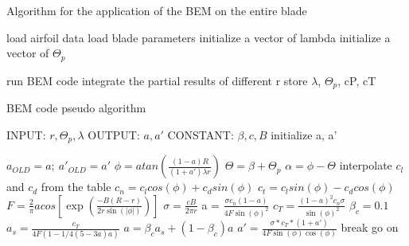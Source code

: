 \begin{algorithm}
\caption{Algorithm for the application of the BEM on the entire blade}\label{alg:MainBEM}
\begin{algorithmic}
\State load airfoil data
\State load blade parameters
\State initialize a vector of lambda
\State initialize a vector of $\Theta_p$

    \State run BEM code
    \EndFor 
    \State integrate the partial results of different r
    \State store $\lambda$, $\Theta_p$, cP, cT
 \EndFor
\EndFor 
\end{algorithmic}
\end{algorithm}

\begin{algorithm}
\caption{BEM code pseudo algorithm}\label{alg:BEM}
\begin{algorithmic}
\State INPUT: $r, \Theta_p, \lambda$
\State OUTPUT: $a, a'$
\State CONSTANT: $\beta, c, B$
\State initialize a, a'

  \State $a_{OLD}=a; \ a'_{OLD}=a'$
  \State  $\phi=atan\left(\frac{(1-a)R}{(1+a')\lambda r}\right)$ 
  \State  $\Theta=\beta + \Theta_p$
  \State  $\alpha = \phi - \Theta$
  \State interpolate $c_l$ and $c_d$ from the table
  \State  $c_n = c_l cos(\phi) + c_d sin(\phi)$
  \State  $c_t = c_l sin(\phi) - c_d cos(\phi)$
  \State  $F = \frac{2}{\pi} acos \left[\exp\left(\frac{-B(R - r)}{2r\sin(\left|\phi\right|)}\right)\right]$
  \State $\sigma = \frac{cB}{2\pi r}$
  \State a = $\frac{\sigma c_n (1 - a)}{4 F \sin(\phi)^2}$
  \Else
    \State $c_T = \frac{(1 - a)^2c_n\sigma}{\sin(\phi)^2}$
    \State $\beta_c = 0.1$
    \State $a_s = \frac{c_T}{4F(1 - 1/4(5 - 3a)a)}$
    \State $a = \beta_c a_s + (1 - \beta_c)a$
  \EndIf
  \State $a' = \frac{\sigma*c_T*(1 + a')}{4F\sin(\phi)\cos(\phi)}$
    \State break
  \Else
    \State go on
  \EndIf
\EndFor
\end{algorithmic}
\end{algorithm}